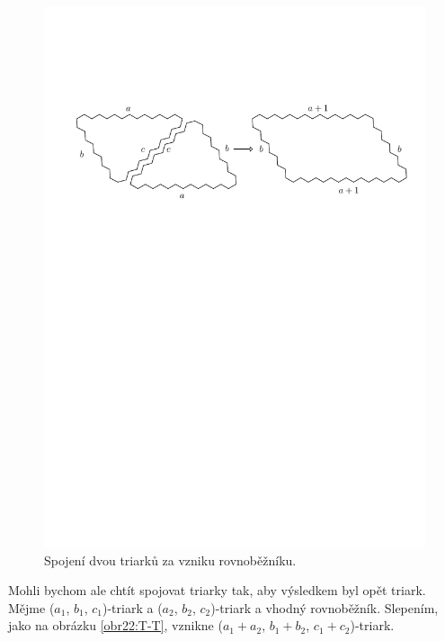\begin{figure}[h!]\centering
\includegraphics[width=\textwidth]{../img/T-P}
\caption{Spojení dvou triarků za vzniku rovnoběžníku.}
\label{obr21:T-P}
\end{figure}

Mohli bychom ale chtít spojovat triarky tak, aby výsledkem byl opět triark. Mějme ($a_1$, $b_1$, $c_1$)-triark a ($a_2$, $b_2$, $c_2$)-triark a vhodný rovnoběžník. Slepením, jako na obrázku \ref{obr22:T-T}, vznikne ($a_1+a_2$, $b_1+b_2$, $c_1+c_2$)-triark. 

